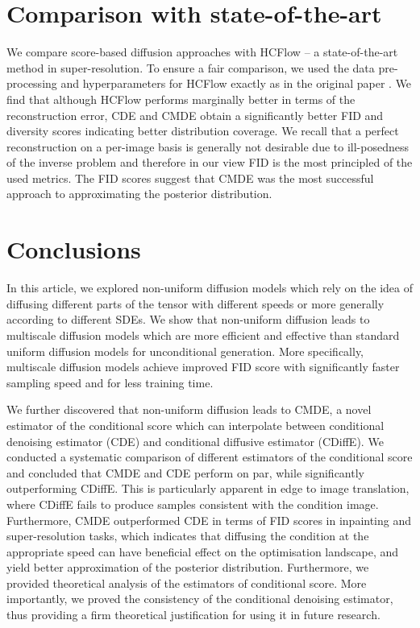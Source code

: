     

\section{Comparison with state-of-the-art}
We compare score-based diffusion approaches with HCFlow \cite{liang2021hrflow} -- a state-of-the-art method in super-resolution. To ensure a fair comparison, we used the data pre-processing and hyperparameters for HCFlow exactly as in the original paper \cite{liang2021hrflow}. We find that although HCFlow performs marginally better in terms of the reconstruction error, CDE and CMDE obtain a significantly better FID and diversity scores indicating better distribution coverage. 
We recall that a perfect reconstruction on a per-image basis is generally not desirable due to ill-posedness of the inverse problem and therefore in our view FID is the most principled of the used metrics.
The FID scores suggest that CMDE was the most successful approach to approximating the posterior distribution.




\section{Conclusions}

In this article, we explored non-uniform diffusion models which rely on the idea of diffusing different parts of the tensor with different speeds or more generally according to different SDEs. We show that non-uniform diffusion leads to multiscale diffusion models which are more efficient and effective than standard uniform diffusion models for unconditional generation. More specifically, multiscale diffusion models achieve improved FID score with significantly faster sampling speed and for less training time.

We further discovered that non-uniform diffusion leads to CMDE, a novel estimator of the conditional score which can interpolate between conditional denoising estimator (CDE) and conditional diffusive estimator (CDiffE). We conducted a systematic comparison of different estimators of the conditional score and concluded that CMDE and CDE perform on par, while significantly outperforming CDiffE. This is particularly apparent in edge to image translation, where CDiffE fails to produce samples consistent with the condition image. Furthermore, CMDE outperformed CDE in terms of FID scores in inpainting and super-resolution tasks, which indicates that diffusing the condition at the appropriate speed can have beneficial effect on the optimisation landscape, and yield better approximation of the posterior distribution. Furthermore, we provided theoretical analysis of the estimators of conditional score. More importantly, we proved the consistency of the conditional denoising estimator, thus providing a firm theoretical justification for using it in future research. 
